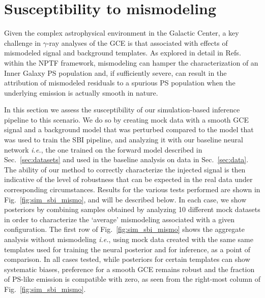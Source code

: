 \documentclass[prd,aps,10pt,nofootinbib,twocolumn,superscriptaddress,preprintnumbers,balancelastpage,longbibliography]{revtex4-1}
\begin{document}

\section{Susceptibility to mismodeling}
\label{sec:mismodeling}

Given the complex astrophysical environment in the Galactic Center, a key challenge in $\gamma$-ray analyses of the GCE is that associated with effects of mismodeled signal and background templates. As explored in detail in Refs.~\cite{Lee:2015fea,Leane:2020pfc,Leane:2020nmi,Buschmann:2020adf,Chang:2019ars} within the NPTF framework, mismodeling can hamper the characterization of an Inner Galaxy PS population and, if sufficiently severe, can result in the attribution of mismodeled residuals to a spurious PS population when the underlying emission is actually smooth in nature. 

In this section we assess the susceptibility of our simulation-based inference pipeline to this scenario. We do so by creating mock data with a smooth GCE signal and a background model that was perturbed compared to the model that was used to train the SBI pipeline, and analyzing it with our baseline neural network \emph{i.e.}, the one trained on the forward model described in Sec.~\ref{sec:datasets} and used in the baseline analysis on data in Sec.~\ref{sec:data}. The ability of our method to correctly characterize the injected signal is then indicative of the level of robustness that can be expected in the real data under corresponding circumstances. Results for the various tests performed are shown in Fig.~\ref{fig:sim_sbi_mismo}, and will be described below. In each case, we show posteriors by combining samples obtained by analyzing 10 different mock datasets in order to characterize the `average' mismodeling associated with a given configuration. The first row of Fig.~\ref{fig:sim_sbi_mismo} shows the aggregate analysis without mismodeling \emph{i.e.}, using mock data created with the same same templates used for training the neural posterior and for inference, as a point of comparison. In all cases tested, while posteriors for certain templates can show systematic biases, preference for a smooth GCE remains robust and the fraction of PS-like emission is compatible with zero, as seen from the right-most column of Fig.~\ref{fig:sim_sbi_mismo}. \\
\end{document}

